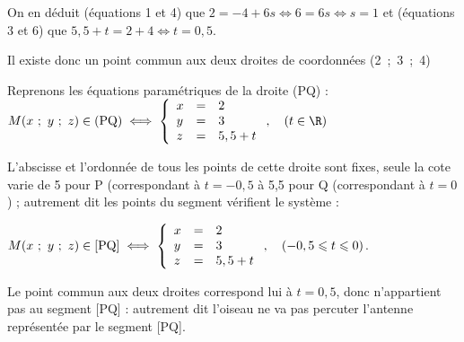 \begin{enumerate}
 On en déduit (équations 1 et 4) que $2 = - 4 + 6s \iff 6 = 6s \iff s = 1$ et (équations 3 et 6) que $5,5 + t = 2 + 4 \iff t = 0,5.$

Il existe donc un point commun aux deux droites de coordonnées (2~;~3~;~4)

Reprenons les équations paramétriques de la droite (PQ) : $M(x~;~y~;~z) \in (\text{PQ}) \iff \left\{\begin{array}{l c l}
x &=& 2\\
y &=&3\\
z &=&5,5 + t
\end{array}\right., \quad (t \in \R)$

L'abscisse et l'ordonnée de tous les points de cette droite sont fixes, seule la cote varie de 5 pour P (correspondant à $t = -0,5$ à 5,5 pour Q (correspondant à $t = 0$) ; autrement dit les points du segment vérifient le système :

$M(x~;~y~;~z) \in [\text{PQ}] \iff \left\{\begin{array}{l c l}
x &=& 2\\
y &=&3\\
z &=&5,5 + t
\end{array}\right., \quad (-0,5 \leqslant t \leqslant 0)$.

Le point commun aux deux droites correspond lui à $t = 0,5$, donc n'appartient pas au segment [PQ] : autrement dit l'oiseau ne va pas percuter l'antenne représentée par le segment [PQ].

\end{enumerate}

\bigskip
